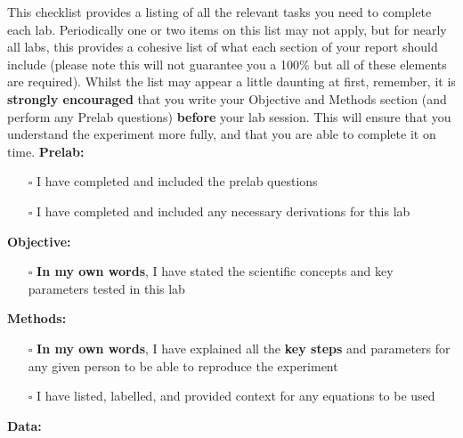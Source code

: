 This checklist provides a listing of all the relevant tasks you need to complete each lab. Periodically one or two items on this list may not apply, but for nearly all labs, this provides a cohesive list of what each section of your report should include (please note this will not guarantee you a 100\% but all of these elements are required). Whilst the list may appear a little daunting at first, remember, it is \textbf{strongly encouraged} that you write your Objective and Methods section (and perform any Prelab questions) \textbf{before} your lab session. This will ensure that you understand the experiment more fully, and that you are able to complete it on time.
\newline
\newline
\textbf{Prelab:}
\begin{itemize}
    \item[$\square$] I have completed and included the prelab questions
    \item[$\square$] I have completed and included any necessary derivations for this lab
\end{itemize}    
\textbf{Objective:}
\begin{itemize}
    \item[$\square$] \textbf{In my own words}, I have stated the scientific concepts and key parameters tested in this lab
\end{itemize}
\textbf{Methods:}
\begin{itemize}
    \item[$\square$] \textbf{In my own words}, I have explained all the \textbf{key steps} and parameters for any given person to be able to reproduce the experiment
    \item[$\square$] I have listed, labelled, and provided context for any equations to be used
\end{itemize}  
\textbf{Data:}
